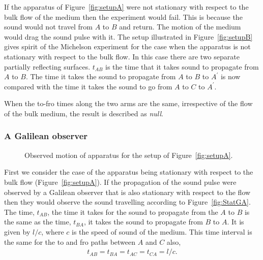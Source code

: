 \documentclass[10pt, fleqn,final,showtrims,oldfontcommands]{article} %
\newcommand{\figref}[1]{Figure~\ref{fig:#1}}
\begin{document}
If the apparatus of \figref{setupA} were not stationary with respect to the bulk flow of the medium then the experiment would fail.
This is because the sound would not travel from  $A$ to $B$ and return.
The motion of the medium would drag the sound pulse with it.
The setup illustrated in \figref{setupB} gives spirit of the Michelson experiment for the case when the apparatus is not stationary with respect to the bulk flow.
In this case there are two separate partially reflecting surfaces.
$t_{AB}$ is the time that it takes sound to propagate from $A$ to $B$.
The time it takes the sound to propagate from $A$ to $B$ to $A^\prime$ is now compared with the time it takes the sound 
to go from $A$ to $C$ to $A^\prime$.

When the to-fro times along the two arms are the same, irrespective of the flow  of the bulk medium,  the result is described as {\em null}.

\subsubsection{A Galilean observer}\label{sec:MMGalilean}

 \begin{figure}[t]
      \centering
\hfill
\label{fig:GalileanA}
      \caption{Observed motion of apparatus for the setup of \figref{setupA}.}
 \end{figure}

First we consider the case of the apparatus being stationary with respect to the bulk flow (\figref{setupA}).
If the propagation of the sound pulse were observed by a Galilean observer that is also stationary with respect to the flow
then they would observe the sound travelling according to \figref{StatGA}.
The time, $t_{AB}$, the time it takes for the sound to propagate from the $A$ to $B$ is the same as the time, $t_{BA}$, it takes the sound to propagate from $B$ to $A$.
It is given by $l/c$, where  $c$ is the speed of sound of the medium.
This time interval is the same for the to and fro paths between $A$ and $C$ also,
\begin{align}
  t_{AB}=t_{BA}=t_{AC}=t_{CA}=l/c\label{eqn:setupA:stationary:Tab}.
\end{align}
\end{document}

